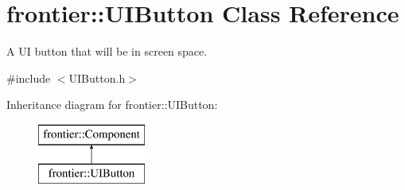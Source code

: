 \hypertarget{classfrontier_1_1_u_i_button}{}\section{frontier\+:\+:U\+I\+Button Class Reference}
\label{classfrontier_1_1_u_i_button}


A UI button that will be in screen space.  




{\ttfamily \#include $<$U\+I\+Button.\+h$>$}

Inheritance diagram for frontier\+:\+:U\+I\+Button\+:\begin{figure}[H]
\begin{center}
\leavevmode
\includegraphics[height=2.000000cm]{classfrontier_1_1_u_i_button}
\end{center}
\end{figure}
